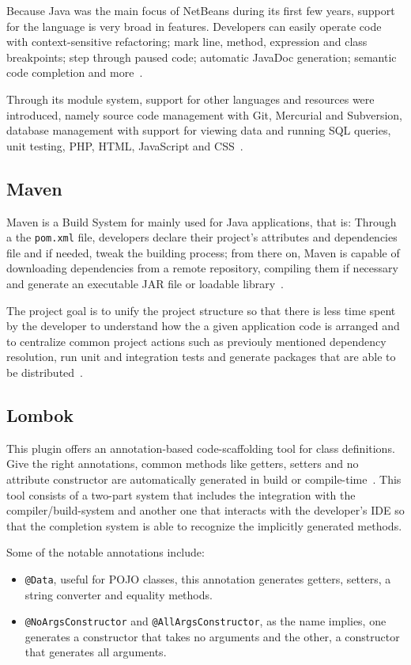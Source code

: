 Because Java was the main focus of NetBeans during its first few years, support for the language is very broad in features. Developers can easily operate code with context-sensitive refactoring; mark line, method, expression and class breakpoints; step through paused code; automatic JavaDoc generation; semantic code completion and more~\cite{nbassistance}.

Through its module system, support for other languages and resources were introduced, namely source code management with Git, Mercurial and Subversion, database management with support for viewing data and running \gls{SQL} queries, unit testing, PHP, HTML, JavaScript and CSS~\cite{nettutorials}.

\subsection{Maven}
Maven is a Build System for mainly used for Java applications, that is: Through a the \texttt{pom.xml} file, developers declare their project's attributes and dependencies file and if needed, tweak the building process; from there on, Maven is capable of downloading dependencies from a remote repository, compiling them if necessary and generate an executable \gls{JAR} file or loadable library~\cite{maven}.

The project goal is to unify the project structure so that there is less time spent by the developer to understand how the a given application code is arranged and to centralize common project actions such as previouly mentioned dependency resolution, run unit and integration tests and generate packages that are able to be distributed~\cite{mavenintro}.

\subsection{Lombok}\label{tech:lombok}
This plugin offers an annotation-based code-scaffolding tool for class definitions. Give the right annotations, common methods like getters, setters and no attribute constructor are automatically generated in build or compile-time~\cite{lombok}. This tool consists of a two-part system that includes the integration with the compiler/build-system and another one that interacts with the developer's \gls{IDE} so that the completion system is able to recognize the implicitly generated methods.

Some of the notable annotations include:
\begin{itemize}
\item \texttt{@Data}, useful for \gls{POJO} classes, this annotation generates getters, setters, a string converter and equality methods.
\item \texttt{@NoArgsConstructor} and \texttt{@AllArgsConstructor}, as the name implies, one generates a constructor that takes no arguments and the other, a constructor that generates all arguments.
\end{itemize}

